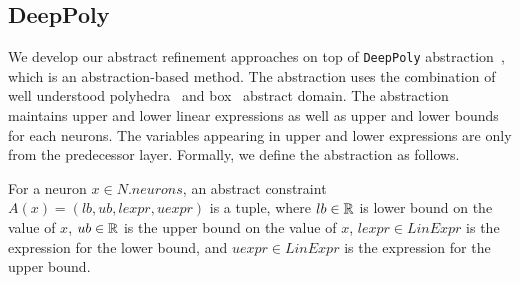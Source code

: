 \subsection{DeepPoly}
\label{sec:deeppoly}
We develop our abstract refinement approaches on top of \texttt{DeepPoly}
abstraction~\cite{deeppoly}, which is an abstraction-based method.
The abstraction uses the combination of
well understood polyhedra~\cite{polyhedra} and box~\cite{boxd} abstract domain.
The abstraction maintains
upper and lower linear expressions
as well as
upper and lower bounds for each neurons.
The variables appearing in upper and lower expressions are only from
the predecessor layer.
Formally, we define the abstraction as follows. 

\begin{df}
    For a neuron $x \in N.neurons$,
    an abstract constraint $A(x) = (lb,ub, lexpr, uexpr)$ is a tuple, where
    $lb \in \mathbb{R}$ is lower bound on the value of $x$,
    $ub \in \mathbb{R}$ is the upper bound on the value of  $x$,
    $lexpr \in LinExpr$ is the expression for the lower bound, and
    $uexpr \in LinExpr$ is the expression for the upper bound.
\end{df}


